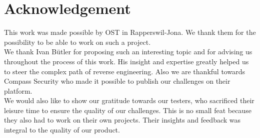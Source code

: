 \chapter*{Acknowledgement}

This work was made possible by OST in Rapperswil-Jona. We thank them for the possibility to be able to work on such a project.\\

\noindent We thank Ivan Bütler for proposing such an interesting topic and for advising us throughout the process of this work. His insight and expertise greatly helped us to steer the complex path of reverse engineering. Also we are thankful towards Compass Security who made it possible to publish our challenges on their platform.\\

\noindent We would also like to show our gratitude towards our testers, who sacrificed their leisure time to ensure the quality of our challenges. This is no small feat because they also had to work on their own projects. Their insights and feedback was integral to the quality of our product.
